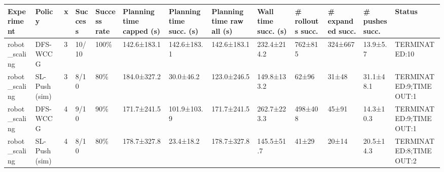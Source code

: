 \begin{tabular}{lllllllllllll}
\toprule
Experiment & Policy & x & Success & Success rate & Planning time capped (s) & Planning time succ. (s) & Planning time raw all (s) & Wall time succ. (s) & \# rollouts succ. & \# expanded succ. & \# pushes succ. & Status \\
\midrule
robot\_scaling & DFS-WCCG & 3 & 10/10 & 100\% & 142.6±183.1 & 142.6±183.1 & 142.6±183.1 & 232.4±214.2 & 762±815 & 324±667 & 13.9±5.7 & TERMINATED:10 \\
robot\_scaling & SL-Push (sim) & 3 & 8/10 & 80\% & 184.0±327.2 & 30.0±46.2 & 123.0±246.5 & 149.8±133.2 & 62±96 & 31±48 & 31.1±48.1 & TERMINATED:9;TIMEOUT:1 \\
robot\_scaling & DFS-WCCG & 4 & 9/10 & 90\% & 171.7±241.5 & 101.9±103.9 & 171.7±241.5 & 262.7±223.3 & 498±408 & 45±91 & 14.3±10.3 & TERMINATED:9;TIMEOUT:1 \\
robot\_scaling & SL-Push (sim) & 4 & 8/10 & 80\% & 178.7±327.8 & 23.4±18.2 & 178.7±327.8 & 145.5±51.7 & 41±29 & 20±14 & 20.5±14.3 & TERMINATED:8;TIMEOUT:2 \\
\bottomrule
\end{tabular}

